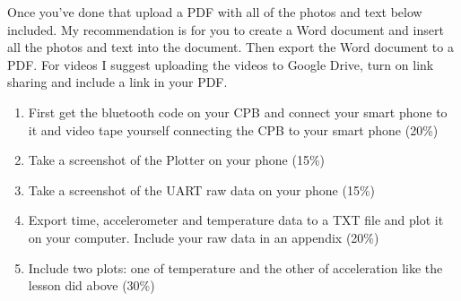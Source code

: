 Once you've done that upload a PDF with all of the photos and text below included. My recommendation is for you to create a Word document and insert all the photos and text into the document. Then export the Word document to a PDF. For videos I suggest uploading the videos to Google Drive, turn on link sharing and include a link in your PDF.
\begin{enumerate}[itemsep=-5pt]
\item First get the bluetooth code on your CPB and connect your smart phone to it and video tape yourself connecting the CPB to your smart phone (20\%)
\item Take a screenshot of the Plotter on your phone (15\%)
\item Take a screenshot of the UART raw data on your phone (15\%)
\item Export time, accelerometer and temperature data to a TXT file and plot it on your computer. Include your raw data in an appendix (20\%)
\item Include two plots: one of temperature and the other of acceleration like the lesson did above (30\%)
\end{enumerate}
